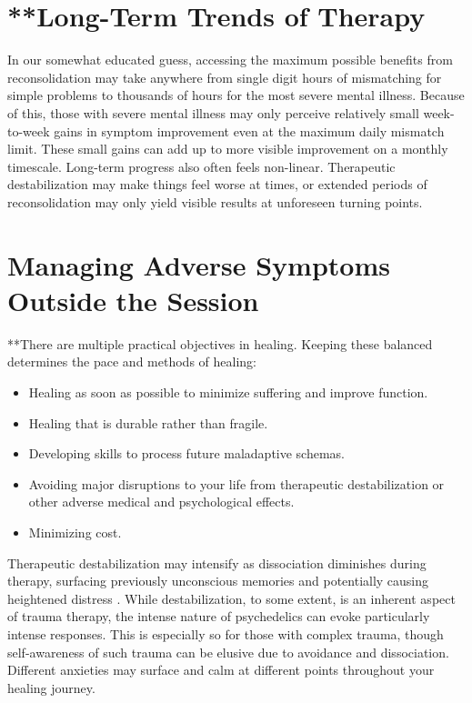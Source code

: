 \documentclass[12pt,letterpaper]{book}
\begin{document}
\section{**Long-Term Trends of Therapy}
In our somewhat educated guess, accessing the maximum possible benefits from reconsolidation may take anywhere from single digit hours of mismatching for simple problems to thousands of hours for the most severe mental illness. Because of this, those with severe mental illness may only perceive relatively small week-to-week gains in symptom improvement even at the maximum daily mismatch limit. These small gains can add up to more visible improvement on a monthly timescale. Long-term progress also often feels non-linear. Therapeutic destabilization may make things feel worse at times, or extended periods of reconsolidation may only yield visible results at unforeseen turning points.
\section{Managing Adverse Symptoms Outside the Session}
\label{sectionManagement}
**There are multiple practical objectives in healing. Keeping these balanced determines the pace and methods of healing: 
\begin{itemize}
    \item Healing as soon as possible to minimize suffering and improve function.
    \item Healing that is durable rather than fragile.
    \item Developing skills to process future maladaptive schemas.
    \item Avoiding major disruptions to your life from therapeutic destabilization or other adverse medical and psychological effects.
    \item Minimizing cost.
\end{itemize}
Therapeutic destabilization may intensify as dissociation diminishes during therapy, surfacing previously unconscious memories and potentially causing heightened distress \cite{vanderKolkBody}. While destabilization, to some extent, is an inherent aspect of trauma therapy, the intense nature of psychedelics can evoke particularly intense responses. This is especially so for those with complex trauma, though self-awareness of such trauma can be elusive due to avoidance and dissociation. Different anxieties may surface and calm at different points throughout your healing journey.
\end{document}
